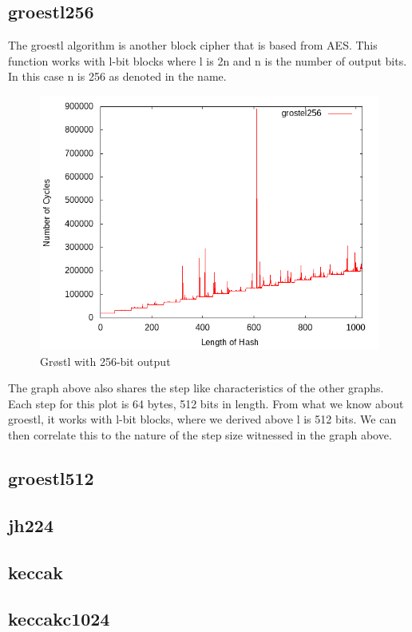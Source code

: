 \documentclass[10pt,a4paper]{article}
\begin{document}
\subsection{groestl256}
The groestl algorithm is another block cipher that is based from AES. This function works with l-bit blocks where l is 2n and n is the number of output bits. In this case n is 256 as denoted in the name. 
    \begin{figure}[H]
        \begin{center}
            \includegraphics[scale=0.5]{images/grostel256.png} 
            \caption{Grøstl with 256-bit output}
        \end{center}
    \end{figure}
The graph above also shares the step like characteristics of the other graphs. Each step for this plot is 64 bytes, 512 bits in length. From what we know about groestl, it works with l-bit blocks, where we derived above l is 512 bits. We can then correlate this to the nature of the step size witnessed in the graph above.


\subsection{groestl512}
\subsection{jh224}
\subsection{keccak}
\subsection{keccakc1024}
\end{document}
